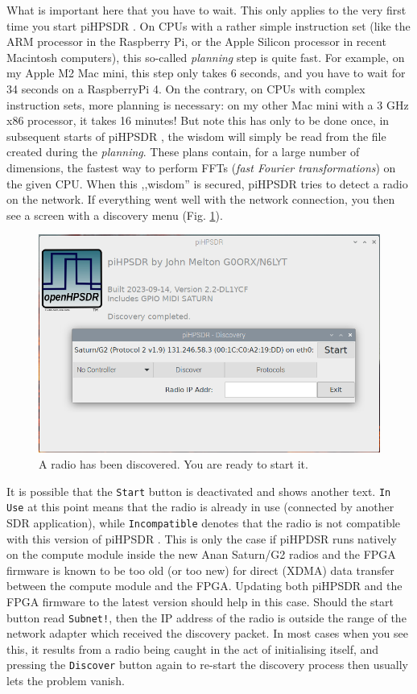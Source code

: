 \documentclass[12pt]{book}
\def\rett#1{\texttt{\color{red}#1}}
\def\pH{pi\-HPSDR }
\begin{document}
What is important here that you have to wait. This only applies to the very first time you start \pH.
On CPUs with a rather simple instruction set (like the ARM processor in the Raspberry Pi, or the Apple
Silicon processor in recent Macintosh computers), this so-called  \textit{planning} step is quite fast. For
example, on my
Apple M2 Mac mini, this step only takes 6 seconds, and you have to wait for 34 seconds on a RaspberryPi 4.
On the contrary, on CPUs with
complex instruction sets, more planning is necessary: on my other Mac mini with a 3 GHz x86 processor, it
takes 16 minutes! But note
this has only to be done once, in subsequent starts of \pH, the wisdom will simply be read from
the file created during the \textit{planning}. These plans contain, for a large number of dimensions,
the fastest way to perform FFTs (\textit{fast Fourier transformations}) on the given CPU.
When this ,,wisdom'' is secured, \pH tries to detect a radio on the network. If everything went well with
the network connection, you then see a screen with a discovery menu (Fig. \ref{fig:Start}).

\begin{figure}
\center
\includegraphics[width=12cm]{Start.png}
\caption{A radio has been discovered. You are ready  to start it.}
\label{fig:Start}
\end{figure}

It is possible that the \rett{Start} button is deactivated and shows another text. \rett{In Use} at
this point means that the radio is already in use (connected by another SDR application), while
\rett{Incompatible} denotes that the radio is not compatible with this version of \pH. This
is only the case if piHPDSR runs natively on the compute module inside the new Anan Saturn/G2
radios and the FPGA firmware is known to be too old (or too new)
for direct (XDMA) data transfer between the compute
module and the FPGA. Updating both \pH and the FPGA firmware to the latest version
should help in this case. Should the start button read \rett{Subnet!}, then the IP address of the
radio is outside the range of the network adapter which received the discovery packet.
In most cases when you see this, it results from a radio being caught in the act of initialising
itself, and pressing the \rett{Discover} button again to re-start the discovery process then
usually lets the problem vanish.
\end{document}
